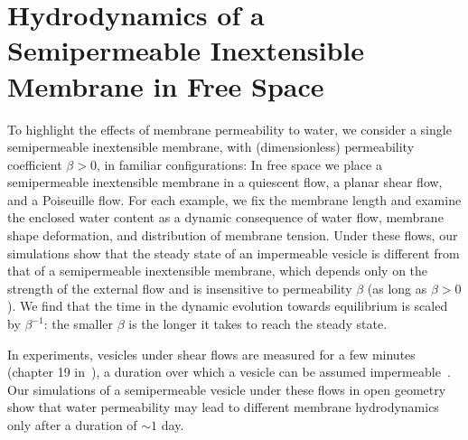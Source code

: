 \documentclass[prb,preprint,showpacs,preprintnumbers,amsmath,amssymb,longbibliography]{revtex4-1}
\begin{document}
\section{Hydrodynamics of a Semipermeable Inextensible Membrane in Free Space\label{sec:free_space}}
To highlight the effects of membrane permeability to water, we consider
a single semipermeable inextensible membrane, with (dimensionless) permeability
coefficient $\beta>0$, in familiar configurations: In free space we
place a semipermeable inextensible membrane in a quiescent flow, a planar shear flow,
and a Poiseuille flow. For each example, we fix the membrane length and
examine the enclosed water content as a dynamic consequence of water
flow, membrane shape deformation, and distribution of membrane tension.
%
Under these flows, our simulations show that the steady state of an
impermeable vesicle is different from that of a semipermeable inextensible membrane,
which depends only on the strength of the external flow and is
insensitive to permeability $\beta$ (as long as $\beta>0$). We find that
the time in the dynamic evolution towards equilibrium is scaled by
$\beta^{-1}$: the smaller $\beta$ is the longer it takes to reach the
steady state.

In experiments, vesicles under shear flows are measured for a few
minutes (chapter 19 in~\citet{Dimova2020_GVB}), a duration over which a
vesicle can be assumed impermeable~\cite{AbkarianViallat2005_BJ}. Our
simulations of a semipermeable vesicle under these flows in open
geometry show that water permeability may lead to different membrane
hydrodynamics only after a duration of $\sim 1$ day. 



\end{document}
